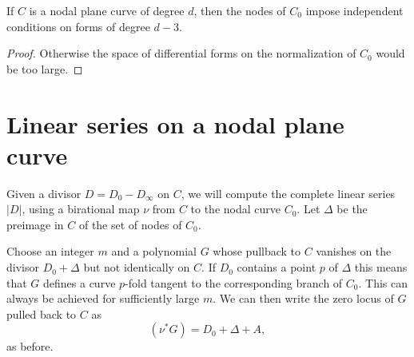 \begin{corollary}
If $C$ is a nodal plane curve of degree $d$, then the nodes of $C_{0}$ impose independent
conditions on forms of degree $d-3$.
\end{corollary}
\begin{proof}
 Otherwise the space of differential forms on the normalization of $C_{0}$ would be too large.
\end{proof}
%
%
%


\section{Linear series on a nodal plane curve}\label{linear series on nodal plane curves}

Given a divisor $D = D_{0}-D_{\infty}$ on $C$, we will compute the complete linear series $|D|$, using a birational map $\nu$ from 
$C$ to the nodal curve $C_0$. Let $\Delta$ be the preimage in $C$ of the set of nodes of $C_{0}$.

Choose an integer $m$ and a polynomial $G$ whose pullback to $C$
  vanishes on the divisor $D_0+\Delta$ 
 but not identically on $C$. If $D_0$ contains a point $p$ of $\Delta$ this means that $G$ defines
 a curve $p$-fold tangent to the corresponding branch of $C_0$. This can always be achieved for
 sufficiently large $m$. We can then write the zero locus of $G$ pulled back to $C$ as
$$
(\nu^*G) = D_0 + \Delta + A,
$$
as before. 

